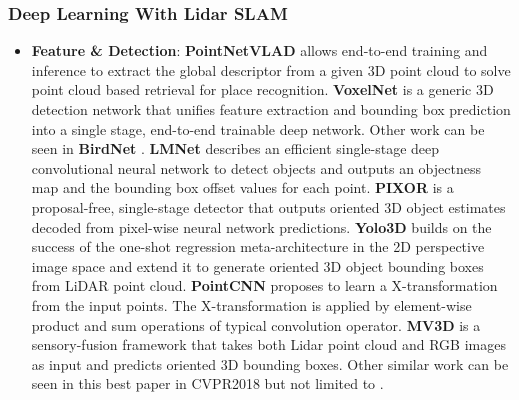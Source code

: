 \documentclass[journal,transmag]{IEEEtran}
\begin{document}
\subsubsection{Deep Learning With Lidar SLAM}
\begin{itemize}
    \item \textbf{Feature \& Detection}: \textbf{PointNetVLAD} \cite{angelina2018pointnetvlad} allows end-to-end training and inference to extract the global descriptor from a given 3D point cloud to solve point cloud based retrieval for place recognition. \textbf{VoxelNet} \cite{zhou2018voxelnet} is a generic 3D detection network that unifies feature extraction and bounding box prediction into a single stage, end-to-end trainable deep network. Other work can be seen in \textbf{BirdNet} \cite{beltran2018birdnet}. \textbf{LMNet} \cite{minemura2018lmnet}  describes an efficient single-stage deep convolutional neural network to detect objects and outputs an objectness map and the bounding box offset values for each point. \textbf{PIXOR} \cite{yang2018pixor} is a proposal-free, single-stage detector that outputs oriented 3D object estimates decoded from pixel-wise neural network predictions. \textbf{Yolo3D} \cite{ali2018yolo3d} builds on the success of the one-shot regression meta-architecture in the 2D perspective image space and extend it to generate oriented 3D object bounding boxes from LiDAR point cloud. \textbf{PointCNN} \cite{li2018pointcnn} proposes to learn a X-transformation from the input points. The X-transformation is applied by element-wise product and sum operations of typical convolution operator. \textbf{MV3D} \cite{chen2017multi} is a sensory-fusion framework that takes both Lidar point cloud and RGB images as input and predicts oriented 3D bounding boxes. Other similar work can be seen in this best paper in CVPR2018 but not limited to \cite{su2018splatnet}. 

\end{itemize}
\end{document}
